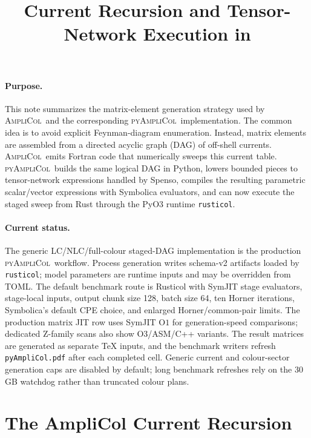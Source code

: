 \documentclass[10pt]{article}
\title{\vspace{-2.0em}Current Recursion and Tensor-Network Execution in \PAC}
\author{}
\date{\vspace{-3.0em}}
\newcommand{\AC}{\textsc{AmpliCol}}
\newcommand{\PAC}{\textsc{pyAmpliCol}}
\begin{document}
\maketitle
\vspace{-1.2em}

\paragraph{Purpose.}
This note summarizes the matrix-element generation strategy used by \AC\ and
the corresponding \PAC\ implementation.  The common idea is to avoid explicit
Feynman-diagram enumeration.  Instead, matrix elements are assembled from a
directed acyclic graph (DAG) of off-shell currents.  \AC\ emits Fortran code
that numerically sweeps this current table.  \PAC\ builds the same logical DAG
in Python, lowers bounded pieces to tensor-network expressions handled by
Spenso, compiles the resulting parametric scalar/vector expressions with
Symbolica evaluators, and can now execute the staged sweep from Rust through
the PyO3 runtime \texttt{rusticol}.

\paragraph{Current status.}
The generic LC/NLC/full-colour staged-DAG implementation is the production
\PAC\ workflow.  Process generation writes schema-v2 artifacts loaded by
\texttt{rusticol}; model parameters are runtime inputs and may be overridden
from TOML.  The default benchmark route is Rusticol with SymJIT stage
evaluators, stage-local inputs, output chunk size 128, batch size 64, ten
Horner iterations, Symbolica's default CPE choice, and enlarged
Horner/common-pair limits.  The production matrix JIT row uses SymJIT
\(\mathrm{O}1\) for generation-speed comparisons; dedicated Z-family scans
also show O3/ASM/C++ variants.  The result matrices are generated as separate
\TeX{} inputs, and the benchmark writers refresh \texttt{pyAmpliCol.pdf}
after each completed cell.  Generic current and colour-sector generation caps
are disabled by default; long benchmark refreshes rely on the 30 GB watchdog
rather than truncated colour plans.

\section{The AmpliCol Current Recursion}
\end{document}
